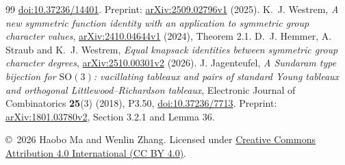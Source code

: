 \documentclass[11pt]{article}
\begin{document}
\begin{thebibliography}{99}
\href{https://doi.org/10.37236/14401}{doi:10.37236/14401}.
Preprint: \href{https://arxiv.org/abs/2509.02796v1}{arXiv:2509.02796v1} (2025).
K.~J. Westrem, \emph{A new symmetric function identity with an application
to symmetric group character values},
\href{https://arxiv.org/abs/2410.04644v1}{arXiv:2410.04644v1} (2024), Theorem 2.1.
D.~J. Hemmer, A. Straub and K.~J. Westrem,
\emph{Equal knapsack identities between symmetric group character degrees},
\href{https://arxiv.org/abs/2510.00301v2}{arXiv:2510.00301v2} (2026).
J. Jagenteufel, \emph{A Sundaram type bijection for $\mathrm{SO}(3)$:
vacillating tableaux and pairs of standard Young tableaux and orthogonal
Littlewood--Richardson tableaux}, Electronic Journal of Combinatorics
\textbf{25}(3) (2018), P3.50,
\href{https://doi.org/10.37236/7713}{doi:10.37236/7713}.
Preprint: \href{https://arxiv.org/abs/1801.03780v2}{arXiv:1801.03780v2},
Section 3.2.1 and Lemma 36.
\end{thebibliography}

\smallskip
\small\copyright\ 2026 Haobo Ma and Wenlin Zhang.
Licensed under \href{https://creativecommons.org/licenses/by/4.0/}{Creative Commons Attribution 4.0 International (CC BY 4.0)}.
\end{document}

